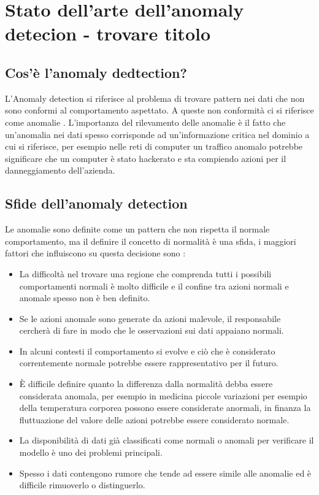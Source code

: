 
\chapter{Stato dell'arte dell'anomaly detecion - trovare titolo}

\section{Cos'è l'anomaly dedtection?}


L'Anomaly detection si riferisce al problema di trovare pattern nei dati che non sono conformi al comportamento aspettato. A queste non conformità ci si riferisce come anomalie \cite{anomaly_detection_survey_3}. L'importanza del rilevamento delle anomalie è il fatto che un'anomalia nei dati spesso corrisponde ad un'informazione critica nel dominio a cui si riferisce, per esempio nelle reti di computer un traffico anomalo potrebbe significare che un computer è stato hackerato e sta compiendo azioni per il danneggiamento dell'azienda.

\section{Sfide dell'anomaly detection}

Le anomalie sono definite come un pattern che non rispetta il normale comportamento, ma il definire il concetto di normalità è una sfida, i maggiori fattori che influiscono su questa decisione sono \cite{anomaly_detection_survey_3}:

\begin{itemize}
    \item La difficoltà nel trovare una regione che comprenda tutti i possibili comportamenti normali è molto difficile e il confine tra azioni normali e anomale spesso non è ben definito.
    \item Se le azioni anomale sono generate da azioni malevole, il responsabile cercherà di fare in modo che le osservazioni sui dati appaiano normali.
    \item In alcuni contesti il comportamento si evolve e ciò che è considerato correntemente normale potrebbe essere rappresentativo per il futuro.
    \item È difficile definire quanto la differenza dalla normalità debba essere considerata anomala, per esempio in medicina piccole variazioni per esempio della temperatura corporea possono essere considerate anormali, in finanza la fluttuazione del valore delle azioni potrebbe essere considerato normale.
    \item La disponibilità di dati già classificati come normali o anomali per verificare il modello è uno dei problemi principali.
    \item Spesso i dati contengono rumore che tende ad essere simile alle anomalie ed è difficile rimuoverlo o distinguerlo.
\end{itemize}


